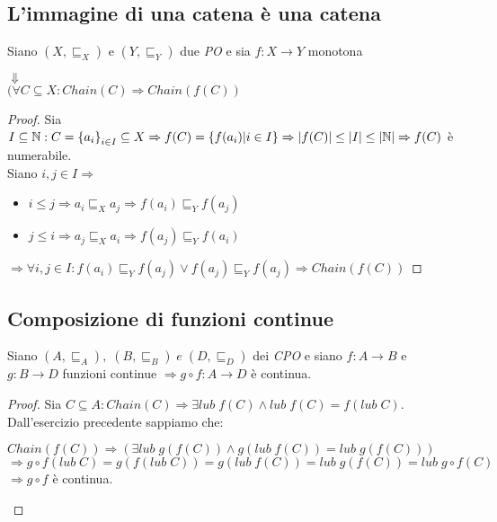 \
\subsection{L'immagine di una catena è una catena}
\begin{esercizio}
  Siano $(X, \sqsubseteq_X)$ e $(Y, \sqsubseteq_Y)$ due \emph{PO} e sia $f: X \rightarrow Y$ monotona
  \begin{center}
    $\Downarrow$\\
    $(\forall C \subseteq X : Chain(C) \Rightarrow Chain(f(C))$
  \end{center}
  \begin{proof}
    Sia $I \subseteq \mathbb{N} : C = \left\{a_i\right\}_{i \in I} \subseteq X \Rightarrow f(C) = \left\{f(a_i) | i \in I\right\} \Rightarrow |f(C)| \leq |I| \leq |\mathbb{N}| \Rightarrow f(C)$ è numerabile.\\
    Siano $i,j \in I \Rightarrow $
    \begin{itemize}
      \setlength{\itemindent}{20mm}
    \item $i \leq j \Rightarrow a_i \sqsubseteq_X a_j \Rightarrow f(a_i) \sqsubseteq_Y f(a_j)$
    \item $j \leq i \Rightarrow a_j \sqsubseteq_X a_i \Rightarrow f(a_j) \sqsubseteq_Y f(a_i)$
    \end{itemize}
    $\Rightarrow \forall i,j \in I : f(a_i) \sqsubseteq_Y f(a_j) \lor f(a_j) \sqsubseteq_Y f(a_j) \Rightarrow Chain(f(C))$
  \end{proof}
\end{esercizio}

\subsection{Composizione di funzioni continue}
\begin{esercizio}
  Siano $ (A, \sqsubseteq_A), \; (B, \sqsubseteq_B) \; e \; (D, \sqsubseteq_D) $ dei \emph{CPO} e siano $ f: A \rightarrow B $ e $ g: B \rightarrow D $ funzioni continue $ \Rightarrow g \circ f : A \rightarrow D $ è continua.
  \begin{proof}
    Sia $C \subseteq A : Chain(C) \Rightarrow \exists lub \; f(C) \land lub \; f(C) = f(lub \; C)$.
    Dall'esercizio precedente sappiamo che:
    \begin{center}
      $ Chain(f(C)) \Rightarrow (\exists lub \; g(f(C)) \land g(lub \; f(C)) = lub \; g(f(C))) $\\
      $ \Rightarrow g \circ f(lub \; C) = g(f(lub \; C)) = g(lub \; f(C)) = lub \; g(f(C)) = lub \; g \circ f(C) $\\
      $ \Rightarrow g \circ f$ è continua.
    \end{center}
  \end{proof}
\end{esercizio}
